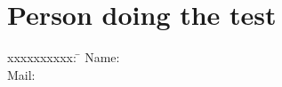 \section{Person doing the test}
\begin{tabbing}
xxxxxxxxxx: \= \kill  %
Name:           \> 
\TextField[name=name,width=5cm,charsize=12pt]
{\mbox{}} 
\\
Mail:  \> \TextField[name=vor,width=5cm,charsize=12pt]
{\mbox{}} \\
\\

\end{tabbing}